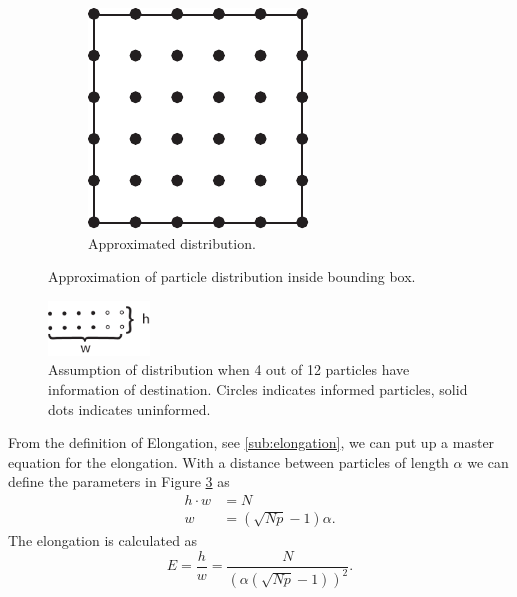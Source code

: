 \begin{figure}[H]
\begin{subfigure}[b]{\figwidth}
		\includegraphics[width=\textwidth]{img/Square.pdf}
		\caption{Approximated distribution.}
		\label{fig:distr_approx}
	\end{subfigure}
	\caption{Approximation of particle distribution inside bounding box.}
	\label{fig:distr}
\end{figure}

\begin{figure}[H]
	\centering
	\includegraphics[width=0.24\textwidth]{img/heightwidth.pdf}
	\caption{Assumption of distribution when 4 out of 12 particles have information of destination. Circles indicates informed particles, solid dots indicates uninformed.}
	\label{fig:distr_direction}
\end{figure}
From the definition of Elongation, see \ref{sub:elongation}, we can put up a master equation for the elongation. With a distance between particles of length $\alpha$ we can define the parameters in Figure \ref{fig:distr_direction} as
\begin{align}
	h\cdot w &= N \\
	w &= (\sqrt{Np}-1)\alpha.
\end{align}
The elongation is calculated as 
\begin{equation}
	E = \frac{h}{w} = \frac{N}{(\alpha(\sqrt{Np}-1))^2}.
\end{equation}

